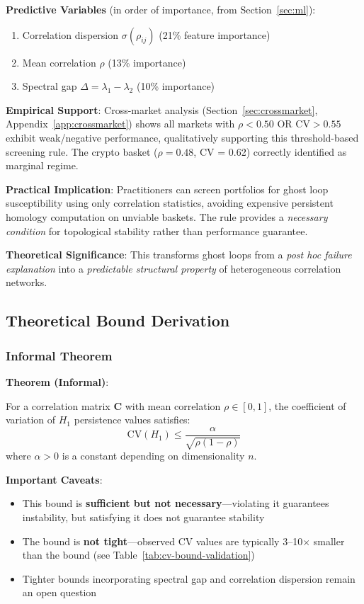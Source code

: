 \textbf{Predictive Variables} (in order of importance, from Section~\ref{sec:ml}):
\begin{enumerate}
\item Correlation dispersion $\sigma(\rho_{ij})$ (21\% feature importance)
\item Mean correlation $\rho$ (13\% importance)
\item Spectral gap $\Delta = \lambda_1 - \lambda_2$ (10\% importance)
\end{enumerate}

\textbf{Empirical Support}: Cross-market analysis (Section~\ref{sec:crossmarket}, Appendix~\ref{app:crossmarket}) shows all markets with $\rho < 0.50$ OR $\text{CV} > 0.55$ exhibit weak/negative performance, qualitatively supporting this threshold-based screening rule. The crypto basket ($\rho = 0.48$, CV = 0.62) correctly identified as marginal regime.

\textbf{Practical Implication}: Practitioners can screen portfolios for ghost loop susceptibility using only correlation statistics, avoiding expensive persistent homology computation on unviable baskets. The rule provides a \textit{necessary condition} for topological stability rather than performance guarantee.

\textbf{Theoretical Significance}: This transforms ghost loops from a \textit{post hoc failure explanation} into a \textit{predictable structural property} of heterogeneous correlation networks.

\subsection{Theoretical Bound Derivation}

\subsubsection{Informal Theorem}

\textbf{Theorem (Informal)}:

For a correlation matrix $\mathbf{C}$ with mean correlation $\rho \in [0, 1]$, the coefficient of variation of $H_1$ persistence values satisfies:
\begin{equation}
\text{CV}(H_1) \leq \frac{\alpha}{\sqrt{\rho(1 - \rho)}}
\label{eq:cv-bound}
\end{equation}
where $\alpha > 0$ is a constant depending on dimensionality $n$.

\textbf{Important Caveats}:
\begin{itemize}
\item This bound is \textbf{sufficient but not necessary}---violating it guarantees instability, but satisfying it does not guarantee stability
\item The bound is \textbf{not tight}---observed CV values are typically 3--10$\times$ smaller than the bound (see Table~\ref{tab:cv-bound-validation})
\item Tighter bounds incorporating spectral gap and correlation dispersion remain an open question
\end{itemize}

